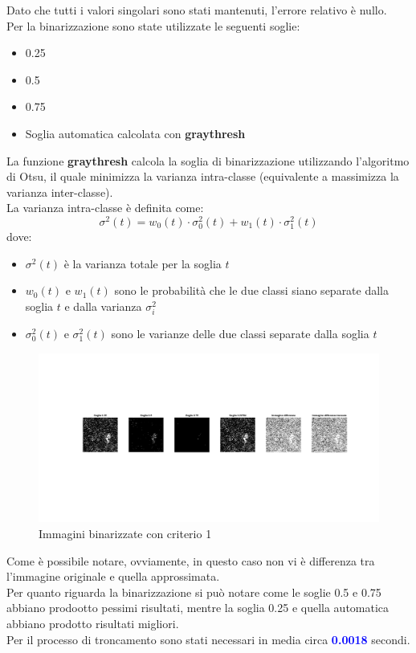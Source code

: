 \noindent Dato che tutti i valori singolari sono stati mantenuti, l'errore relativo è nullo.\\
Per la binarizzazione sono state utilizzate le seguenti soglie:
\begin{itemize}
    \item 0.25
    \item 0.5
    \item 0.75
    \item Soglia automatica calcolata con \textbf{graythresh}
\end{itemize}
\noindent La funzione \textbf{graythresh} calcola la soglia di binarizzazione utilizzando l'algoritmo di Otsu, il quale minimizza la varianza intra-classe (equivalente a massimizza la varianza inter-classe).\\La varianza intra-classe è definita come:
\begin{equation}
    \sigma^2(t) = w_0(t) \cdot \sigma_0^2(t) + w_1(t) \cdot \sigma_1^2(t)
\end{equation}
dove:
\begin{itemize}
    \item $\sigma^2(t)$ è la varianza totale per la soglia $t$
    \item $w_0(t)$ e $w_1(t)$ sono le probabilità che le due classi siano separate dalla soglia $t$ e dalla varianza $\sigma_i^2$
    \item $\sigma_0^2(t)$ e $\sigma_1^2(t)$ sono le varianze delle due classi separate dalla soglia $t$
\end{itemize}

\begin{figure}[H]
    \centering
     \includegraphics[width=\textwidth]{images/Criterio1.jpg}
    \caption{Immagini binarizzate con criterio 1}
\end{figure}

\noindent Come è possibile notare, ovviamente, in questo caso non vi è differenza tra l'immagine originale e quella approssimata.\\
Per quanto riguarda la binarizzazione si può notare come le soglie 0.5 e 0.75 abbiano prodootto pessimi risultati, mentre la soglia 0.25 e quella automatica abbiano prodotto risultati migliori.\\
\noindent Per il processo di troncamento sono stati necessari in media circa \textcolor{blue}{\textbf{0.0018}} secondi.\\





